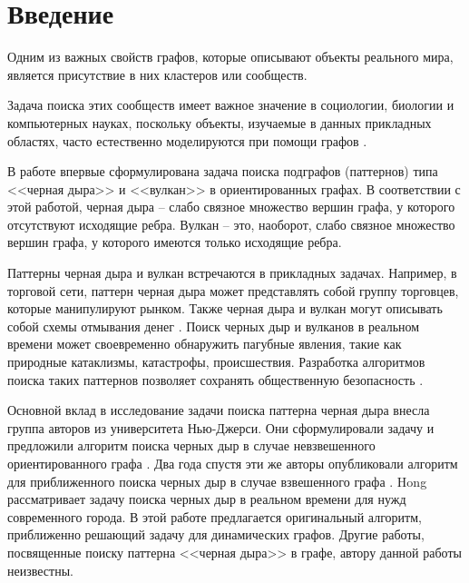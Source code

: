 \documentclass[12pt,a4paper,oneside,openany]{article}
\theoremstyle{definition}
\theoremstyle{lemma}
\theoremstyle{remark}
\begin{document}
\setcounter{page}{2}

\setcounter{tocdepth}{2}
\tableofcontents
{}

\cleardoublepage
\section{Введение}\label{sec:otherintro}

Одним из важных свойств графов, которые описывают объекты реального мира,
является присутствие в них кластеров или сообществ.

Задача поиска этих сообществ имеет важное значение в социологии, биологии и компьютерных науках,
поскольку объекты, изучаемые в данных прикладных областях, часто естественно моделируются при
помощи графов \cite{fortunato2010community}.

В работе \cite{li2010detecting} впервые сформулирована задача поиска подграфов (паттернов)
типа <<черная дыра>> и <<вулкан>> в ориентированных графах. В соответствии с этой работой,
черная дыра -- слабо связное множество вершин графа, у которого отсутствуют исходящие ребра.
Вулкан -- это, наоборот, слабо связное множество вершин графа, у которого имеются только исходящие ребра.

Паттерны черная дыра и вулкан встречаются в прикладных задачах. Например, в торговой сети,
паттерн черная дыра может представлять собой группу торговцев, которые манипулируют рынком.
Также черная дыра и вулкан могут описывать собой схемы отмывания денег \cite{semenov2017survey}.
Поиск черных дыр и вулканов в реальном времени может своевременно обнаружить пагубные явления,
такие как природные катаклизмы, катастрофы, происшествия.
Разработка алгоритмов поиска таких паттернов позволяет сохранять общественную безопасность \cite{hong2015detecting}.

Основной вклад в исследование задачи поиска паттерна черная дыра внесла группа авторов из университета Нью-Джерси.
Они сформулировали задачу и предложили алгоритм поиска черных дыр в случае невзвешенного ориентированного графа \cite{li2010detecting}.
Два  года спустя эти же авторы опубликовали алгоритм для приближенного поиска черных дыр в случае взвешенного графа \cite{li2012mining,li2014mining}.
Hong \cite{hong2015detecting} рассматривает задачу поиска черных дыр в реальном времени для  нужд современного города.
В этой работе предлагается оригинальный алгоритм, приближенно решающий задачу для динамических графов.
Другие работы, посвященные поиску паттерна <<черная дыра>> в графе, автору данной работы неизвестны.
\end{document}
